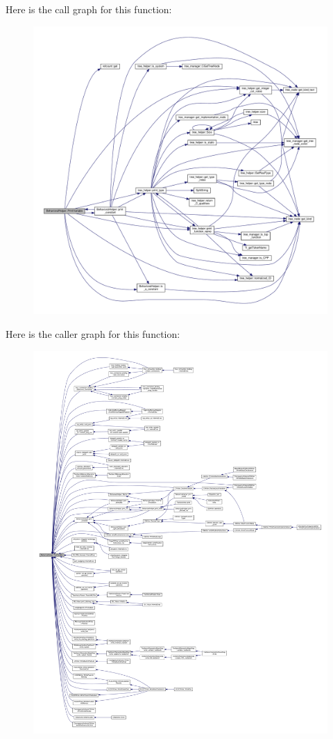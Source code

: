 Here is the call graph for this function\+:
\nopagebreak
\begin{figure}[H]
\begin{center}
\leavevmode
\includegraphics[width=350pt]{dd/db2/classBehavioralHelper_ab93bdf8fecf2a9740d9bc2cd65421a64_cgraph}
\end{center}
\end{figure}
Here is the caller graph for this function\+:
\nopagebreak
\begin{figure}[H]
\begin{center}
\leavevmode
\includegraphics[width=350pt]{dd/db2/classBehavioralHelper_ab93bdf8fecf2a9740d9bc2cd65421a64_icgraph}
\end{center}
\end{figure}
